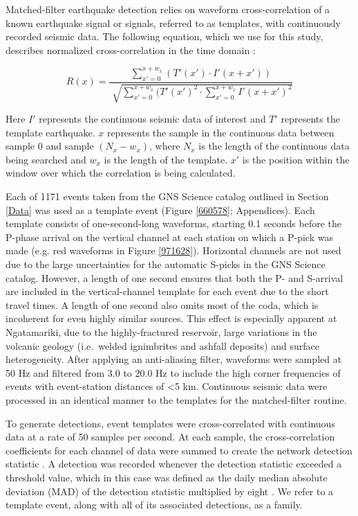 Matched-filter earthquake detection relies on waveform cross-correlation of a
known earthquake signal or signals, referred to as templates, with continuously recorded seismic data. The following equation, which we use for this study, describes normalized cross-correlation in the time domain \citep{Chamberlain_2017}:

\begin{equation}
R(x) = \frac{\sum_{x'=0}^{x+w_{x}}(T'(x') \cdot I'(x + x'))}{\sqrt[]{\sum_{x'=0}^{x+w_{x}}(T'(x')^2 \cdot \sum_{x'=0}^{x+w_{x}}I'(x + x')^2}}
\end{equation}

Here $I'$ represents the continuous seismic data of interest and $T'$ represents the template earthquake. $x$ represents the sample in the continuous data between sample $0$ and sample $(N_{x} - w_{x})$, where $N_{x}$ is the length of the continuous data being searched and $w_{x}$ is the length of the template. $x'$ is the position within the window over which the correlation is being calculated.

Each of 1171 events taken from the GNS Science catalog outlined in Section \ref{Data} was used as a template event (Figure \ref{660578}; Appendices). Each template consists of one-second-long waveforms, starting 0.1 seconds before the P-phase arrival on the vertical channel at each station on which a P-pick was made (e.g. red waveforms in Figure \ref{971628}). Horizontal channels are not used due to the large uncertainties for the automatic S-picks in the GNS Science catalog. However, a length of one second ensures that both the P- and S-arrival are included in the vertical-channel template for each event due to the short travel times. A length of one second also omits most of the coda, which is incoherent for even highly similar sources. This effect is especially apparent at Ngatamariki, due to the highly-fractured reservoir, large variations in the volcanic geology (i.e.\ welded ignimbrites and ashfall deposits) and surface heterogeneity. After applying an anti-aliasing filter, waveforms were sampled at 50 Hz and filtered from 3.0 to 20.0 Hz to include the high corner frequencies of events with event-station distances of \textless5 km. Continuous seismic data were processed in an identical manner to the templates for the matched-filter routine.

To generate detections, event templates were cross-correlated with continuous
data at a rate of 50 samples per second. At each sample, the cross-correlation
coefficients for each channel of data were summed to create the network detection statistic \citep{Shelly_2007}. A detection was recorded whenever the detection statistic exceeded a threshold value, which in this case was defined as the daily median absolute deviation (MAD) of the detection statistic multiplied by eight \citep[as suggested by][]{Shelly_2007}. We refer to a template event, along with all of its associated detections, as a family.

